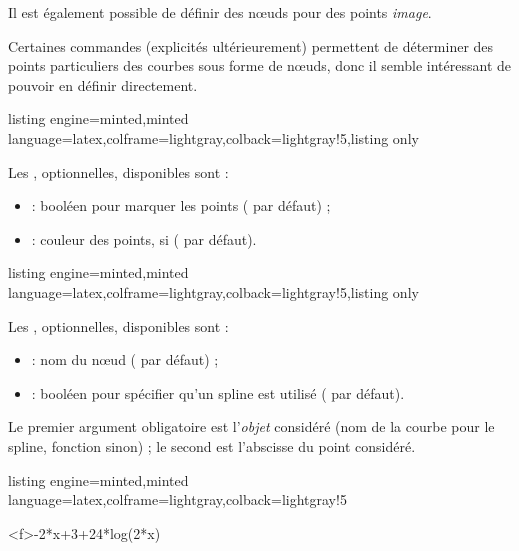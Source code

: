 \documentclass[11pt,a4paper]{ltxdoc}
\begin{document}
\smallskip

Il est également possible de définir des nœuds pour des points \textit{image}.

\smallskip

Certaines commandes (explicités ultérieurement) permettent de déterminer des points particuliers des courbes sous forme de nœuds, donc il semble intéressant de pouvoir en définir directement.

\begin{tcblisting}{listing engine=minted,minted language=latex,colframe=lightgray,colback=lightgray!5,listing only}
\end{tcblisting}

Les \MontreCode{[clés]}, optionnelles, disponibles sont :

\smallskip

\begin{itemize}
	\item {} : booléen pour marquer les points ( par défaut) ;
	\item {} : couleur des points, si  ( par défaut).
\end{itemize}

\begin{tcblisting}{listing engine=minted,minted language=latex,colframe=lightgray,colback=lightgray!5,listing only}
\end{tcblisting}

Les \MontreCode{[clés]}, optionnelles, disponibles sont :

\smallskip

\begin{itemize}
	\item {} : nom du nœud ( par défaut) ;
	\item {} : booléen pour spécifier qu'un spline est utilisé ( par défaut).
\end{itemize}

Le premier argument obligatoire est l'\textit{objet} considéré (nom de la courbe pour le spline, fonction sinon) ; le second est l'abscisse du point considéré.

\begin{tcblisting}{listing engine=minted,minted language=latex,colframe=lightgray,colback=lightgray!5}
\begin{GraphiqueTikz}%
	[x=0.9cm,y=0.425cm,Xmin=4,Xmax=20,Origx=4,
	Ymin=40,Ymax=56,Ygrille=2,Ygrilles=1,Origy=40]
	{-2*x+3+24*log(2*x)}
\end{GraphiqueTikz}
\end{tcblisting}
\end{document}
